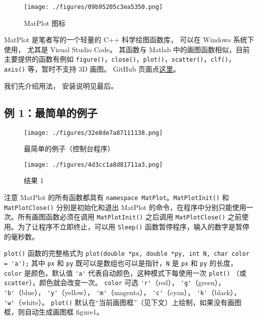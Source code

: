 
\begin{figure}[ht]
\centering
\texttt{[image: ./figures/09b95205c3ea5350.png]}
\caption{MatPlot 图标} \label{fig_MtPlot_1}
\end{figure}

MatPlot 是笔者写的一个轻量的 C++ 科学绘图函数库， 可以在 Windows 系统下使用， 尤其是 Visual Studio Code。 其函数与 Matlab 中的画图函数相似，目前主要提供的函数有例如 \verb`figure()`，\verb`close()`，\verb`plot()`，\verb`scatter()`，\verb`clf()`，\verb`axis()` 等，暂时不支持 3D 画图。 GitHub 页面点\href{https://github.com/MacroUniverse/MatPlot}{这里}。

我们先介绍用法， 安装说明见最后。

\subsection{例 1：最简单的例子}

\begin{figure}[ht]
\centering
\texttt{[image: ./figures/32e8de7a87111138.png]}
\caption{最简单的例子（控制台程序）} \label{fig_MtPlot_2}
\end{figure}

\begin{figure}[ht]
\centering
\texttt{[image: ./figures/4d3cc1a8d81711a3.png]}
\caption{结果 1} \label{fig_MtPlot_3}
\end{figure}

注意 MatPlot 的所有函数都具有 \verb`namespace MatPlot`。\verb`MatPlotInit()` 和 \verb`MatPlotClose()` 分别是初始化和退出 MatPlot 的命令，在程序中分别只能使用一次。所有画图函数必须在调用 \verb`MatPlotInit()` 之后调用 \verb`MatPlotClose()` 之前使用。为了让程序不立即终止，可以用 \verb`Sleep()` 函数暂停程序，输入的数字是暂停的毫秒数。

\verb`plot()` 函数的完整格式为
\verb`plot(double *px, double *py, int N, char color = 'a');`
其中 \verb`px` 和 \verb`py` 既可以是数组也可以是指针，\verb`N` 是 \verb`px` 和 \verb`py` 的长度，\verb`color` 是颜色，默认值 \verb`'a'` 代表自动颜色，这种模式下每使用一次 \verb`plot()` （或 \verb`scatter`），颜色就会改变一次。 \verb`color` 可选
\verb`'r'`（red），
\verb`'g'`（green），
\verb`'b'`（blue），
\verb`'y'`（yellow），
\verb`'m'`（magenta），
\verb`'c'`（cyan），
\verb`'k'`（black），
\verb`'w'`（white）。
\verb`plot()` 默认在“当前画图框”（见下文）上绘制，如果没有画图框，则自动生成画图框 figure1。

